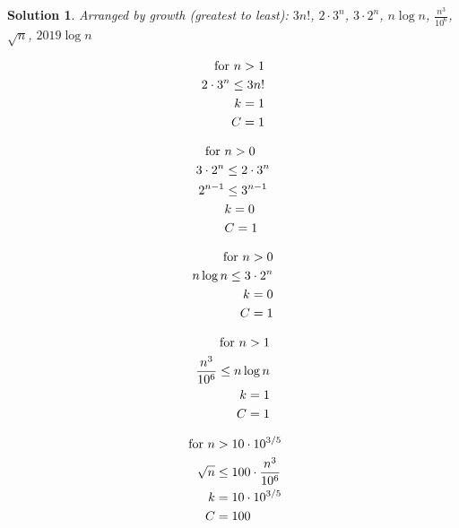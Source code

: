 \documentclass{article}
\theoremstyle{plain}
\theoremstyle{break}
\newtheorem{solution}{Solution}
\begin{document}
\begin{solution}
Arranged by growth (greatest to least):
$3n!$, 
$2\cdot3^n$, 
$3\cdot2^n$, 
$n\log{n}$, 
$\displaystyle \frac{n^3}{10^6}$, 
$\sqrt{n}$, 
$2019\log{n}$

\begin{equation}
\begin{split}
\textnormal{ for } n > 1 \\
2\cdot3^n \leq 3n! \\
k = 1\\
C = 1\\
\end{split} 
\end{equation}

\begin{equation}
\begin{split}
\textnormal{ for }& n > 0 \\
3\cdot2^n & \leq 2\cdot3^n \\
2^{n-1} & \leq 3^{n-1} \\
&k = 0\\
&C = 1\\
\end{split} 
\end{equation}

\begin{equation}
\begin{split}
\textnormal{ for } n > 0 \\
n\log{n} \leq 3\cdot2^n \\
k = 0\\
C = 1\\
\end{split} 
\end{equation}

\begin{equation}
\begin{split}
\textnormal{ for } n > 1 \\
\displaystyle \frac{n^3}{10^6} \leq n\log{n} \\
k = 1\\
C = 1\\
\end{split} 
\end{equation}

\begin{equation}
\begin{split}
\textnormal{ for } n & > 10 \cdot 10^{3/5} \\
\sqrt{n} & \leq 100 \cdot \displaystyle \frac{n^3}{10^6} \\
k &= 10\cdot 10^{3/5}\\
C &= 100\\
\end{split} 
\end{equation}


\end{solution}
\end{document}
